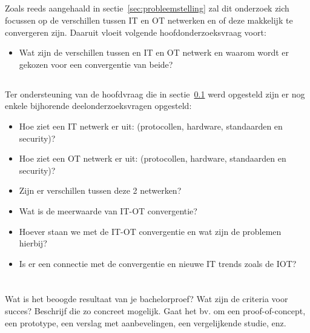 \subsection{}
\label{subsec:hoofdonderzoeksvraag}
Zoals reeds aangehaald in sectie~\ref{sec:probleemstelling} zal dit onderzoek zich focussen op de verschillen tussen IT en OT netwerken en of deze makkelijk te convergeren zijn. Daaruit vloeit volgende hoofdonderzoeksvraag voort:
\begin{itemize}
    \item Wat zijn de verschillen tussen en IT en OT netwerk en waarom wordt er gekozen voor een convergentie van beide?
\end{itemize}

\subsection{}
\label{subsec:deeldonderzoeksvraag}
Ter ondersteuning van de hoofdvraag die in sectie~\ref{subsec:hoofdonderzoeksvraag} werd opgesteld zijn er nog enkele bijhorende deelonderzoeksvragen opgesteld:
\begin{itemize}
    \item Hoe ziet een IT netwerk er uit: (protocollen, hardware, standaarden en security)?
    \item Hoe ziet een OT netwerk er uit: (protocollen, hardware, standaarden en security)?
    \item Zijn er verschillen tussen deze 2 netwerken?
    \item Wat is de meerwaarde van IT-OT convergentie?
    \item Hoever staan we met de IT-OT convergentie en wat zijn de problemen hierbij?  
    \item Is er een connectie met de convergentie en nieuwe IT trends zoals de IOT?
    
\end{itemize} 

\section{}
\label{sec:onderzoeksdoelstelling}

Wat is het beoogde resultaat van je bachelorproef? Wat zijn de criteria voor succes? Beschrijf die zo concreet mogelijk. Gaat het bv. om een proof-of-concept, een prototype, een verslag met aanbevelingen, een vergelijkende studie, enz.

